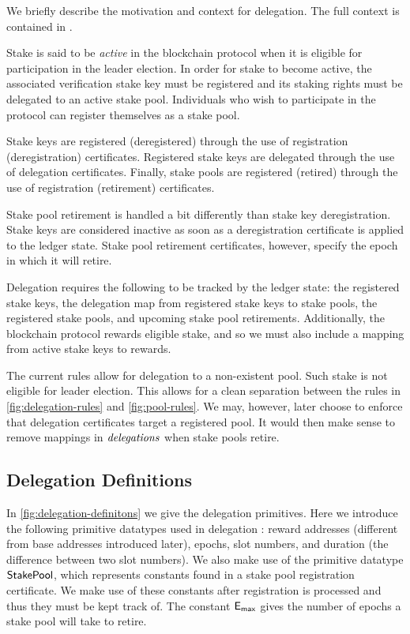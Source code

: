 
We briefly describe the motivation and context for delegation.
The full context is contained in \cite{delegation_design}.

Stake is said to be \textit{active} in the blockchain protocol
when it is eligible for participation in the leader election. In order for
stake to become active,
the associated verification stake key must be registered
and its staking rights must be delegated to an active stake pool.
Individuals who wish to participate in the protocol can
register themselves as a stake pool.

Stake keys are registered (deregistered) through the use of
registration (deregistration) certificates.
Registered stake keys are delegated through the use of delegation certificates.
Finally, stake pools are registered (retired) through the use of
registration (retirement) certificates.

Stake pool retirement is handled a bit differently than stake key deregistration.
Stake keys are considered inactive as soon as a deregistration certificate
is applied to the ledger state.
Stake pool retirement certificates, however, specify the epoch in
which it will retire.

Delegation requires the following to be tracked by the ledger state:
the registered stake keys, the delegation map from registered stake keys to stake
pools, the registered stake pools, and upcoming stake pool retirements.
Additionally, the blockchain protocol rewards eligible stake, and so we must
also include a mapping from active stake keys to rewards.



\begin{note}
  The current rules allow for delegation to a non-existent pool.
  Such stake is not eligible for leader election.
  This allows for a clean separation between the rules in
  \cref{fig:delegation-rules} and \cref{fig:pool-rules}.
  We may, however, later choose to enforce that delegation certificates
  target a registered pool. It would then make sense to remove
  mappings in $\mathit{delegations}$ when stake pools retire.
\end{note}


\subsection{Delegation Definitions}
\label{sec:deleg-defs}

In \cref{fig:delegation-definitons} we give the delegation primitives.
Here we introduce the following primitive datatypes used in delegation :
reward addresses
(different from base addresses introduced later),
epochs, slot numbers, and duration (the difference between two slot numbers).
We also make use of the primitive datatype $\mathsf{StakePool}$, which represents
constants found in a stake pool registration certificate. We make use of
these constants after registration is processed and thus they must be kept
track of.
The constant $\mathsf{E_{max}}$ gives the number of epochs a stake pool will take to retire.

